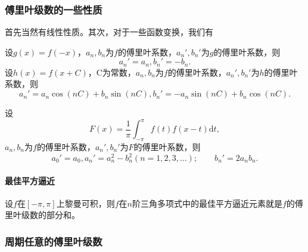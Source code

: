 \documentclass[UTF8]{ctexart}
\begin{document}
\subsubsection{傅里叶级数的一些性质}\label{sec:fourier-series-attributes}

首先当然有线性性质。其次，对于一些函数变换，我们有

设$g(x) = f(-x)$，$a_n, b_n$为$f$的傅里叶系数，$a_n', b_n'$为$g$的傅里叶系数，则
\[
a_n' = a_n, b_n' = -b_n.
\]
设$h(x) = f(x+C)$，C为常数，$a_n, b_n$为$f$的傅里叶系数，$a_n', b_n'$为$h$的傅里叶系数，则
\[
a_n' = a_n \cos (nC) + b_n \sin (nC), b_n' = -a_n \sin (nC) + b_n \cos (nC).
\]

设
\[
F(x) = \frac{1}{\pi} \int_{-\pi}^{\pi} f(t) f(x-t) \mathrm{d}t,
\]
$a_n, b_n$为$f$的傅里叶系数，$a_n', b_n'$为$F$的傅里叶系数，则
\[
a_0' = a_0, a_n' = a_n^2 - b_n^2 (n = 1, 2, 3, \ldots); \qquad b_n' = 2a_n b_n.
\]


\paragraph{最佳平方逼近}
设$f$在$[-\pi, \pi]$上黎曼可积，则$f$在$n$阶三角多项式中的最佳平方逼近元素就是$f$的傅里叶级数的部分和。

\subsubsection{周期任意的傅里叶级数}
\end{document}
